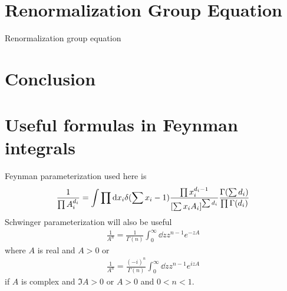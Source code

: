\documentclass[aps,prd,preprint,showkeys,notitlepage,10pt]{revtex4-1}
\begin{document}
\section{Renormalization Group Equation\label{sec:rge}}
Renormalization group equation

\section{Conclusion}
\appendix

\section{Useful formulas in Feynman integrals}
Feynman parameterization used here is
\begin{align}
	\frac{1}{\prod A_i^{d_i}}=\int\prod \dd x_i \delta(\sum x_i-1)\frac{\prod x_i^{d_i-1}}{\bqty{\sum x_iA_i}^{\sum d_i}}\frac{\Gamma(\sum d_i)}{\prod\Gamma(d_i)}
	\label{FEYNMANPARA}
\end{align}
Schwinger parameterization will also be useful
\begin{align}
	\frac{1}{A^n}=\frac{1}{\Gamma{(n)}}\int_0^\infty\dd z z^{n-1}e^{-zA}
\end{align}
where $A$ is real and $A>0$ or
\begin{align}
	\frac{1}{A^n}=\frac{(-i)^{n}}{\Gamma{(n)}}\int_0^\infty\dd z z^{n-1}e^{izA}
\end{align}
if $A$ is complex and $\Im A>0$ or $A>0$ and $0<n<1$.
\end{document}
